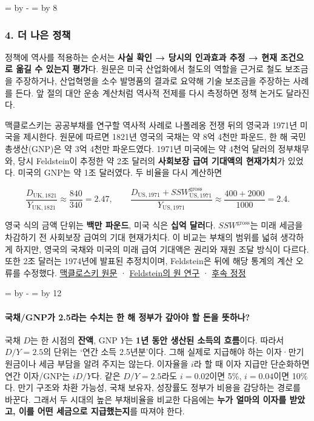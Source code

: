 \documentclass[10pt,a4paper]{article}
\newcommand{\ReserveQuestionSpace}{%
  \par\begingroup
  \dimen0=\pagegoal \advance\dimen0 by -\pagetotal
  \dimen2=\baselineskip \multiply\dimen2 by 12
  \ifdim\dimen0<\dimen2 \newpage\fi
  \endgroup}
\newcommand{\ReserveReadingSectionSpace}{%
  \par\begingroup
  \dimen0=\pagegoal \advance\dimen0 by -\pagetotal
  \dimen2=\baselineskip \multiply\dimen2 by 8
  \ifdim\dimen0<\dimen2 \newpage\fi
  \endgroup}
\begin{document}
\ReserveReadingSectionSpace
\subsubsection*{4. 더 나은 정책}

정책에 역사를 적용하는 순서는 \textbf{사실 확인 → 당시의 인과효과 추정 → 현재 조건으로 옮길 수 있는지 평가}다. 원문은 미국 산업화에서 철도의 역할을 근거로 철도 보조금을 주장하거나, 산업혁명을 소수 발명품의 결과로 요약해 기술 보조금을 주장하는 사례를 든다. 앞 절의 대안 운송 계산처럼 역사적 전제를 다시 측정하면 정책 논거도 달라진다.\par

맥클로스키는 공공부채를 연구할 역사적 사례로 나폴레옹 전쟁 뒤의 영국과 1971년 미국을 제시한다. 원문에 따르면 1821년 영국의 국채는 약 8억 4천만 파운드, 한 해 국민총생산(GNP)은 약 3억 4천만 파운드였다. 1971년 미국에는 약 4천억 달러의 정부채무와, 당시 Feldstein이 추정한 약 2조 달러의 \textbf{사회보장 급여 기대액의 현재가치}가 있었다. 미국의 GNP는 약 1조 달러였다. 두 비율을 다시 계산하면\par

\[
\frac{D_{\mathrm{UK},1821}}{Y_{\mathrm{UK},1821}}\approx\frac{840}{340}=2.47,\qquad
\frac{D_{\mathrm{US},1971}+SSW_{\mathrm{US},1971}^{\mathrm{gross}}}{Y_{\mathrm{US},1971}}\approx\frac{400+2000}{1000}=2.4.
\]

영국 식의 금액 단위는 \textbf{백만 파운드}, 미국 식은 \textbf{십억 달러}다. $SSW^{\mathrm{gross}}$는 미래 세금을 차감하기 전 사회보장 급여의 기대 현재가치다. 이 비교는 부채의 범위를 넓혀 생각하게 하지만, 영국의 국채와 미국의 미래 급여 기대액은 권리와 재원 조달 방식이 다르다. 또한 2조 달러는 1974년에 발표된 추정치이며, Feldstein은 뒤에 해당 통계의 계산 오류를 수정했다. \href{https://www.deirdremccloskey.com/docs/pdf/Article\_92.pdf}{맥클로스키 원문} · \href{https://www.journals.uchicago.edu/doi/10.1086/260246}{Feldstein의 원 연구} · \href{https://www.nber.org/papers/w0579}{후속 정정}\par

\ReserveQuestionSpace
\paragraph{국채/GNP가 2.5라는 수치는 한 해 정부가 갚아야 할 돈을 뜻하나?}
국채 $D$는 한 시점의 \textbf{잔액}, GNP $Y$는 \textbf{1년 동안 생산된 소득의 흐름}이다. 따라서 $D/Y=2.5$의 단위는 ‘연간 소득 2.5년분’이다. 그해 실제로 지급해야 하는 이자·만기 원금이나 세금 부담을 알려 주지는 않는다. 이자율을 $i$라 할 때 이자 지급만 단순화하면 연간 이자/GNP는 $iD/Y$다. 같은 $D/Y=2.5$라도 $i=0.02$이면 5\%, $i=0.04$이면 10\%다. 만기 구조와 차환 가능성, 국채 보유자, 성장률도 정부가 비용을 감당하는 경로를 바꾼다. 그래서 두 시대의 높은 부채비율을 비교한 다음에는 \textbf{누가 얼마의 이자를 받았고, 이를 어떤 세금으로 지급했는지}를 따져야 한다.\par
\end{document}

